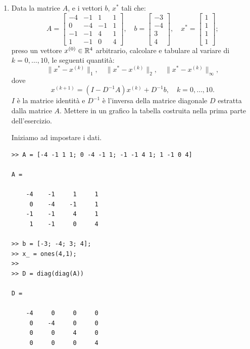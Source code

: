 \begin{enumerate}
\item
Data la matrice $A$, e i vettori $b$, $x^*$ tali che:
\[
A = \left[ 
\begin{array}{cccc}
-4 & -1 & 1 & 1 \\
0 & -4 & -1 & 1 \\
-1 & -1 & 4 & 1 \\
1 & -1 & 0 & 4
\end{array}
\right], \quad 
b = \left[ 
\begin{array}{c}
-3  \\
-4 \\
3 \\
4
\end{array}
\right], \quad 
x^* = \left[ 
\begin{array}{c}
1  \\
1 \\
1 \\
1
\end{array}
\right];
\] 
preso un vettore $x^{(0)} \in \mathbb{R}^{4}$ arbitrario, calcolare e tabulare al 
variare di $k = 0, \ldots, 10$, le seguenti quantità:
\[
\|x^*-x^{(k)}\|_1,\quad \|x^*-x^{(k)}\|_2,\quad \|x^*-x^{(k)}\|_\infty,
\]
dove
\[
x^{(k+1)} = (I-D^{-1}A)x^{(k)} + D^{-1}b, \quad k = 0, \ldots, 10.
\]
$I$ è la matrice identità e $D^{-1}$ è l'inversa della matrice diagonale $D$ 
estratta dalla matrice $A$. Mettere in un grafico la tabella costruita nella
prima parte dell'esercizio.

\begin{svol}
Iniziamo ad impostare i dati.
\begin{codice}
\begin{verbatim}
>> A = [-4 -1 1 1; 0 -4 -1 1; -1 -1 4 1; 1 -1 0 4]

A =

    -4    -1     1     1
     0    -4    -1     1
    -1    -1     4     1
     1    -1     0     4

>> b = [-3; -4; 3; 4];
>> x_ = ones(4,1);
>> 
>> D = diag(diag(A))

D =

    -4     0     0     0
     0    -4     0     0
     0     0     4     0
     0     0     0     4


\end{verbatim}
\end{codice}
\end{svol}
\end{enumerate}
